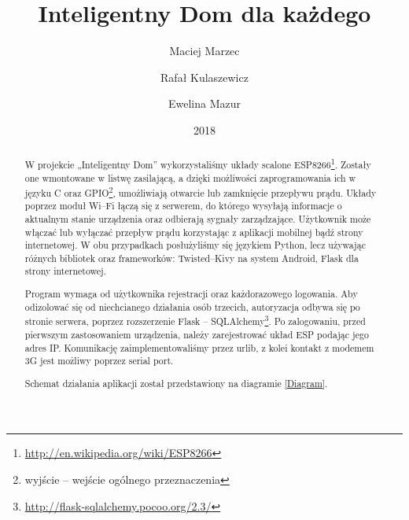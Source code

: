 \documentclass{xmgr}
\author   {Maciej Marzec}
\author   {Rafał Kulaszewicz}
\author   {Ewelina Mazur}
\title    {Inteligentny Dom dla każdego}
\date     {2018}
\begin{document}
\begin{abstract}
W projekcie „Inteligentny Dom” wykorzystaliśmy układy scalone ESP8266\footnote{\url{http://en.wikipedia.org/wiki/ESP8266}}. Zostały one wmontowane w listwę zasilającą, a dzięki możliwości zaprogramowania ich w języku C oraz GPIO\footnote{wyjście -- wejście ogólnego przeznaczenia}, umożliwiają otwarcie lub zamknięcie przepływu prądu. Układy poprzez moduł Wi--Fi łączą się z serwerem, do którego wysyłają informacje o aktualnym stanie urządzenia oraz odbierają sygnały zarządzające. Użytkownik może włączać lub wyłączać przepływ prądu korzystając z aplikacji mobilnej bądź strony internetowej. W obu przypadkach posłużyliśmy się językiem Python, lecz używając różnych bibliotek oraz frameworków: Twisted--Kivy na system Android,  Flask dla strony internetowej. 

Program wymaga od użytkownika rejestracji oraz każdorazowego logowania. Aby odizolować się od niechcianego działania osób trzecich, autoryzacja odbywa się po stronie serwera, poprzez rozszerzenie Flask -- SQLAlchemy\footnote{\url{http://flask-sqlalchemy.pocoo.org/2.3/}}. Po zalogowaniu, przed pierwszym zastosowaniem urządzenia, należy zarejestrować układ ESP podając jego adres IP. Komunikację zaimplementowaliśmy przez urlib, z kolei kontakt z modemem 3G jest możliwy poprzez serial port. 

Schemat działania aplikacji został przedstawiony na diagramie \ref{Diagram}.


\end{abstract}


\maketitle
\end{document}
